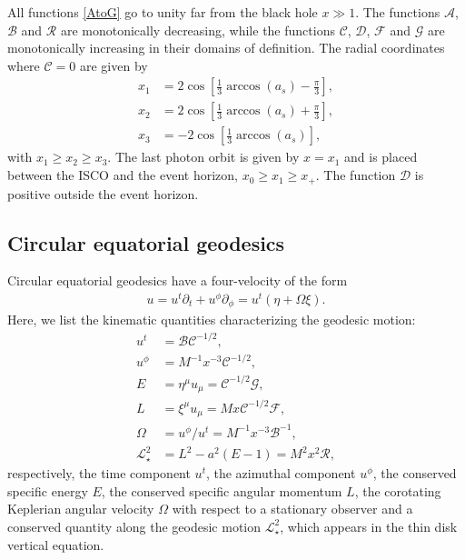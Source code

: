 \documentclass[a4paper,fleqn,usenatbib]{mnrasMOD}
\numberwithin{equation}{section}
\def\p{\partial}
\begin{document}
All functions \eqref{AtoG} go to unity far from the black hole $x \gg 1$.
The functions $\mathcal{A}$, $\mathcal{B}$ and $\mathcal{R}$ are monotonically decreasing, while the functions $\mathcal{C}$, $\mathcal{D}$, $\mathcal{F}$ and $\mathcal{G}$ are monotonically increasing in their domains of definition. The radial coordinates where $\mathcal{C} =0 $ are given by 
\begin{subequations}
\begin{align}
x_1 &= 2 \cos \left[ \frac{1}{3}\arccos(a_s) - \frac{\pi}{3} \right] ,\\
x_2 &= 2 \cos \left[ \frac{1}{3}\arccos(a_s) + \frac{\pi}{3} \right] ,\\
x_3 &= -2 \cos \left[ \frac{1}{3}\arccos(a_s)  \right],
\end{align}
\end{subequations}
with $x_1 \geq x_2 \geq x_3$. The last photon orbit is given by $x=x_1$ and is placed between the ISCO and the event horizon, $x_0 \geq x_1 \geq x_+$. The function $\mathcal{D}$ is positive outside the event horizon. 



\subsection{Circular equatorial geodesics} \label{CEGs}

Circular equatorial geodesics have a four-velocity of the form
\begin{subequations}
\begin{align}
u = u^{t}\p_t + u^{\phi}\p_{\phi} = u^{t}(\eta + \Omega \xi).
\end{align}
\end{subequations}
Here, we list the kinematic quantities characterizing the geodesic motion:
\begin{subequations} \label{kin quantities1}
\begin{align}
u^{t} &= \mathcal{B}\mathcal{C}^{-1/2},\\
u^{\phi} &= M^{-1} x^{-3} \mathcal{C}^{-1/2},\\
E &= \eta^{\mu} u_{\mu} = \mathcal{C}^{-1/2} \mathcal{G}, \\
L &= \xi^{\mu} u_{\mu} = M x  \mathcal{C}^{-1/2} \mathcal{F},\\
\Omega &= u^{\phi}/u^{t} = M^{-1} x^{-3} \mathcal{B}^{-1},\\
\mathcal{L}^{2}_{\star} &= L^{2} - a^2(E - 1) = M^2 x^2 \mathcal{R},
\end{align}
\end{subequations}
respectively, the time component $u^{t}$, the azimuthal component $u^{\phi}$, the conserved specific energy $E$, the conserved specific angular momentum $L$, the corotating Keplerian angular velocity $\Omega$ with respect to a stationary observer and a conserved quantity along the geodesic motion $\mathcal{L}^{2}_{\star}$, which appears in the thin disk vertical equation.
\end{document}
